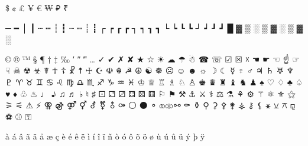 \begin{raggedright}
\$ ¢ £ ¥ € ₩ ₽ ₹

─ ━ │ ┃ ┄ ┅ ┆ ┇ ┈ ┉ ┊ ┋ ┌ ┍ ┎ ┏ ┐ ┑ ┒ ┓ └ ┕ ┖ ┗ ┘ ┙ ┚ ┛
█ ▓ ▒ ░ ▒ ▓ ░ ▒ ▓ ░

© ® ™ § ¶ † ‡ ‰ ′ ″ ‴ … ✓ ✔ ✗ ✘ ★ ☆ ☀ ☁ ☂ ☃ ☎ ☏ ☑ ☒ ☓ ☚ ☛ ☜ ☝ ☞ ☟ ☠ ☢ ☣ ☤ ☥ ☦ ☧ ☨ ☩ ☪ ☫ ☬ ☭ ☮ ☯ ☸ ☹ ☺ ☻ ☼ ☽ ☾ ☿ ♀ ♂ ♃ ♄ ♅ ♆ ♇ ♈ ♉ ♊ ♋ ♌ ♍ ♎ ♏ ♐ ♑ ♒ ♓ ♔ ♕ ♖ ♗ ♘ ♙ ♚ ♛ ♜ ♝ ♞ ♟ ♠ ♡ ♢ ♣ ♤ ♥ ♦ ♧ ♨ ♩ ♪ ♫ ♬ ♭ ♮ ♯ ⚀ ⚁ ⚂ ⚃ ⚄ ⚅ ⚐ ⚑ ⚒ ⚓ ⚔ ⚕ ⚖ ⚗ ⚘ ⚙ ⚚ ⚛ ⚜ ⚝ ⚞ ⚟ ⚠ ⚡ ⚢ ⚣ ⚤ ⚥ ⚦ ⚧ ⚨ ⚩ ⚪ ⚫ ⚬ ⚭ ⚮ ⚯ ⚰ ⚱ ⚲ ⚳ ⚴ ⚵ ⚶ ⚷ ⚸ ⚹ ⚺ ⚻ ⚼ ⚽ ⚾ ⚿

à á â ã ä å æ ç è é ê ë ì í î ï ñ ò ó ô õ ö ø ù ú û ü ý þ ÿ
\end{raggedright}


